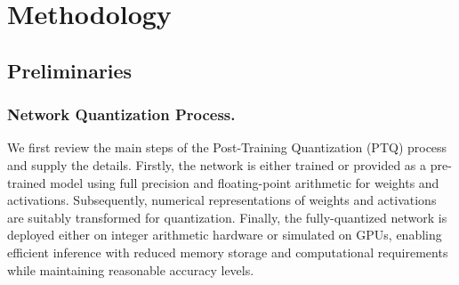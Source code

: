 \documentclass[runningheads]{llncs}
\begin{document}
%
\section{Methodology}
\subsection{Preliminaries}
%
\subsubsection{Network Quantization Process.} 
%
We first review the main steps of the Post-Training Quantization (PTQ) process and supply the details. Firstly, the network is either trained or provided as a pre-trained model using full precision and floating-point arithmetic for weights and activations. Subsequently, numerical representations of weights and activations are suitably transformed for quantization. Finally, the fully-quantized network is deployed either on integer arithmetic hardware or simulated on GPUs, enabling efficient inference with reduced memory storage and computational requirements while maintaining reasonable accuracy levels. 
%
\end{document}
